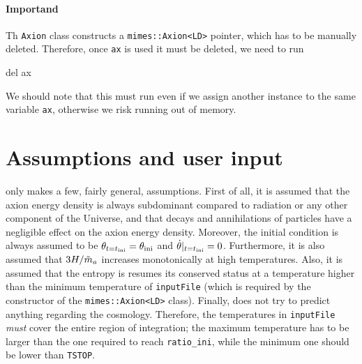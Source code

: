 \documentclass[11pt,a4paper]{article}
\begin{document}
\paragraph{Importand} Th {\tt Axion} class constructs a {\tt mimes::Axion<LD>} pointer, which has to be manually deleted. Therefore, once {\tt ax} is used it must be deleted, \ie we need to run 
%
\begin{py}
	del ax
\end{py}
%
We should note that this must run even if we assign another instance to the same variable {\tt ax}, otherwise we risk running out of memory.

\section{Assumptions and user input}\label{sec:assumptions}
\setcounter{equation}{0}
%
\mimes only makes a few, fairly general, assumptions. First of all, it is assumed that the axion energy density is always subdominant compared to radiation or any other component of the Universe, and that decays and annihilations of particles have a negligible effect on the axion energy density. Moreover, the initial condition is always assumed to be $\theta_{t=t_{\rm ini}{}} = \theta_{\rm ini}{}$ and $\dot \theta|_{t=t_{\rm ini}{}}=0$. 
%
Furthermore, it is also assumed that $3H/\tilde m_{a}{}$ increases monotonically at high temperatures. 
%
Also, it is assumed that the entropy is resumes its conserved status at a temperature higher than the minimum temperature of  {\tt inputFile} (which is required by the constructor of the {\tt mimes::Axion<LD>} class).  
%
Finally, \mimes does not try to predict anything regarding the cosmology. Therefore, the temperatures in {\tt inputFile} {\em must} cover the entire region of  integration; \ie the maximum temperature has to be larger than the one required to reach {\tt ratio\_ini}, while the minimum one should be lower than {\tt TSTOP}.
\end{document}

